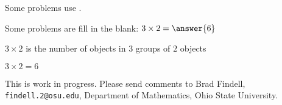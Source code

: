 \documentclass[nooutcomes]{ximera}
\begin{document}
\begin{example}
  Some problems use .
\end{example}

\begin{example}
Some problems are fill in the blank: 
  $3\times 2 = \answer{6}$   
  \begin{hint}
    $3 \times 2$ is the number of objects in $3$ groups of $2$ objects
  \end{hint}
  \begin{hint}
    \begin{image}
    \end{image}
  \end{hint}
  \begin{hint}
    $3\times 2=6$
  \end{hint}
\end{example}

This is work in progress.  Please send comments to Brad Findell, \texttt{findell.2@osu.edu}, Department of Mathematics, Ohio State University.  
\end{document}
